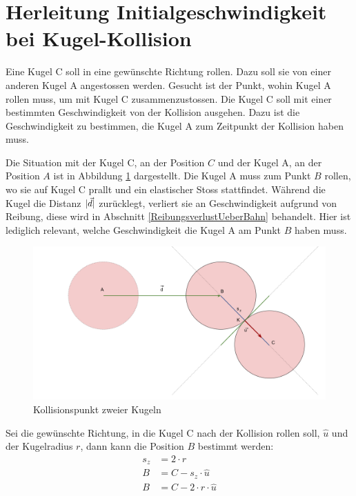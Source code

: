 \section{Herleitung Initialgeschwindigkeit bei Kugel-Kollision}\label{anhang:herleitung:ballCollisionReverse}
Eine Kugel C soll in eine gewünschte Richtung rollen. Dazu soll sie von einer anderen Kugel A angestossen werden.
Gesucht ist der Punkt, wohin Kugel A rollen muss, um mit Kugel C zusammenzustossen.
Die Kugel C soll mit einer bestimmten Geschwindigkeit von der Kollision ausgehen.
Dazu ist die Geschwindigkeit zu bestimmen, die Kugel A  zum Zeitpunkt der Kollision haben muss.

Die Situation mit der Kugel C, an der Position $C$ und der Kugel A, an der Position $A$ ist in Abbildung \ref{fig:ballCollisionPointReverse_anhang}
dargestellt. Die Kugel A muss zum Punkt $B$ rollen, wo sie auf Kugel C prallt und ein elastischer Stoss \cite{wiki.elastischer_stoss_physik:1} stattfindet.
Während die Kugel die Distanz $\lvert \vec{d} \rvert$ zurücklegt, verliert sie an Geschwindigkeit aufgrund von Reibung,
diese wird in Abschnitt \ref{ReibungsverlustUeberBahn} behandelt. Hier ist lediglich relevant, welche Geschwindigkeit
die Kugel A am Punkt $B$ haben muss.

\begin{figure}[h!]
    \begin{center}
        \includegraphics[width=0.6\linewidth]{../common/03_billiard_ai/resources/21_kollisionspunkt_rueckwaerts.png}
    \end{center}
    \caption{Kollisionspunkt zweier Kugeln}
    \label{fig:ballCollisionPointReverse_anhang}
\end{figure}

Sei die gewünschte Richtung, in die Kugel C nach der Kollision rollen soll, $\hat{u}$ und der Kugelradius $r$, dann kann die Position $B$ bestimmt werden:
\begin{align}
    s_z &= 2 \cdot r\\
    B &= C - s_z \cdot \hat{u}\\
    B &= C - 2 \cdot r \cdot \hat{u}
\end{align}

